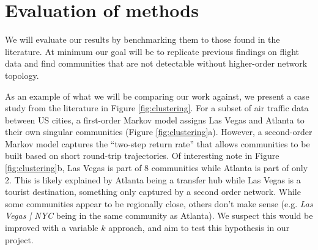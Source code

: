 \documentclass[sigconf]{acmart}
\begin{document}
\section{Evaluation of methods}

We will evaluate our results by benchmarking them to those found in the literature. At minimum our goal will be to replicate previous findings on flight data \cite{Rosvall2014} and find communities that are not detectable without higher-order network topology.

As an example of what we will be comparing our work against, we present a case study from the literature in Figure \ref{fig:clustering}\cite{Rosvall2014}.
For a subset of air traffic data between US cities, a first-order Markov model assigns Las Vegas and Atlanta to their own singular communities (Figure \ref{fig:clustering}a).
However, a second-order Markov model captures the ``two-step return rate'' that allows communities to be built based on short round-trip trajectories.
Of interesting note in Figure \ref{fig:clustering}b, Las Vegas is part of 8 communities while Atlanta is part of only 2.
This is likely explained by Atlanta being a transfer hub while Las Vegas is a tourist destination, something only captured by a second order network. While some communities appear to be regionally close, others don't make sense (e.g. \textit{Las Vegas | NYC} being in the same community as Atlanta).
We suspect this would be improved with a variable $k$ approach, and aim to test this hypothesis in our project.



\newpage



\appendix
\end{document}
